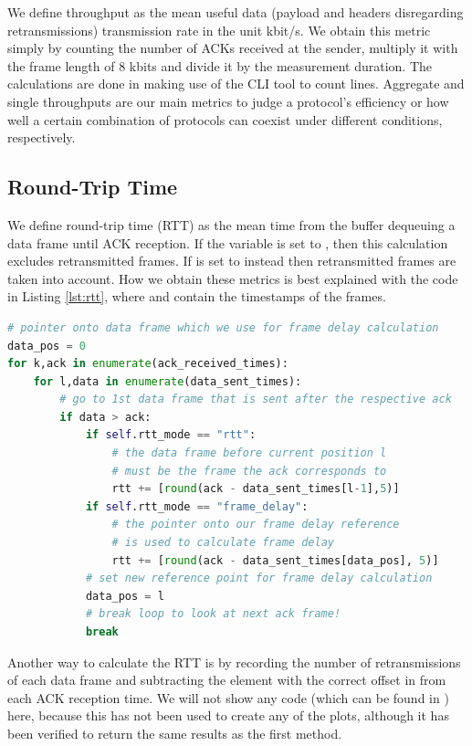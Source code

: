We define throughput as the mean useful data (payload and headers disregarding retransmissions) transmission rate in the unit kbit/s. We obtain this metric simply by counting the number of ACKs received at the sender, multiply it with the frame length of 8 kbits and divide it by the measurement duration. The calculations are done in  making use of the CLI tool  to count lines. Aggregate and single throughputs are our main metrics to judge a protocol's efficiency or how well a certain combination of protocols can coexist under different conditions, respectively.

\subsection{Round-Trip Time}
\label{sec:rtt}

We define round-trip time (RTT) as the mean time from the buffer dequeuing a data frame until ACK reception. If the variable  is set to , then this calculation excludes retransmitted frames. If  is set to  instead then retransmitted frames are taken into account. How we obtain these metrics is best explained with the code in Listing \ref{lst:rtt}, where  and  contain the timestamps of the frames. 

\begin{lstlisting}[language=Python, caption=The method used in \code{rtt\_alternative.py} to calculate RTT and frame delay,label=lst:rtt]
# pointer onto data frame which we use for frame delay calculation
data_pos = 0
for k,ack in enumerate(ack_received_times):
    for l,data in enumerate(data_sent_times):
		# go to 1st data frame that is sent after the respective ack 
        if data > ack:
            if self.rtt_mode == "rtt":
				# the data frame before current position l 
				# must be the frame the ack corresponds to
                rtt += [round(ack - data_sent_times[l-1],5)]
            if self.rtt_mode == "frame_delay":
				# the pointer onto our frame delay reference
				# is used to calculate frame delay
                rtt += [round(ack - data_sent_times[data_pos], 5)]
			# set new reference point for frame delay calculation
            data_pos = l
			# break loop to look at next ack frame!
            break
\end{lstlisting} 

Another way to calculate the RTT is by recording the number of retransmissions of each data frame and subtracting the element with the correct offset in  from each ACK reception time. We will not show any code (which can be found in ) here, because this has not been used to create any of the plots, although it has been verified to return the same results as the first method. 


